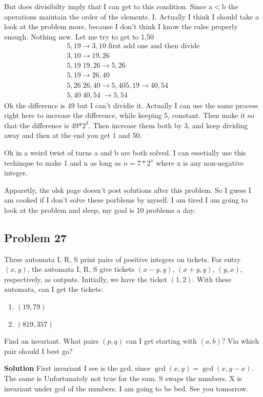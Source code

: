 \documentclass[12pt,tikz,border=10pt]{article}
\theoremstyle{definition}
\theoremstyle{remark}
\begin{document}
But does divisibilty imply that I can get to this condition. Since a$<$b the operations maintain the order of the elements.
I.
Actually I think I should take a look at the problem more, because I don't think I know the rules properly enough.
Nothing new.
Let me try to get to 1,50
\begin{align*}    
5,19 \rightarrow 3, 10 \text{ first add one and then divide}\\
3,10 \rightarrow 19,26\\
5,19 \; 19,26 \rightarrow 5,26\\
5,19 \rightarrow 26,40\\
5,26 \;26,40 \rightarrow 5,40
5,19 \rightarrow 40,54\\
5,40 \; 40, 54 \; \rightarrow 5,54
\end{align*}
Ok the difference is 49 but I can't dividie it. Actually I can use the same process right here to
increase the difference, while keeping 5, constant. Then make it so that the difference is 49*$2^{3}$. 
Then increase them both by 3, and keep dividing away and then at the end you get  1 and 50. 

Ok in a weird twist of turns a and b are both solved. I can essetially use this techinque to make 1 and n as long as $n=7*2^{x}$ where x is any 
non-negative integer.

Apparetly, the olsk page doesn't post solutions after this problem. So I guess I am cooked if I don't solve these porblems by myself.
I am tired I am going to look at the problem and sleep, my goal is 10 problems a day.

\subsection{Problem 27}
Three automata I, R, S print pairs of positive integers on tickets. For entry $(x, y)$, the
automata I, R, S give tickets $(x-y, y)$, $(x+y, y)$, $(y, x)$, respectively, as outputs.
Initially, we have the ticket $(1, 2)$. With these automata, can I get the tickets:
\begin{enumerate}
    \item $(19, 79)$
    \item $(819, 357)$
\end{enumerate}
Find an invariant. What pairs $(p, q)$ can I get starting with $(a, b)$? Via which pair should I best go?

\textbf{Solution}
First invariant I see is the gcd, since $\gcd(x, y) = \gcd(x, y - x)$. The same is Unfortunately not true for the sum.
S swaps the numbers. X is invariant under gcd of the numbers. I am going to be bed.
See you tomorrow.
\end{document}
